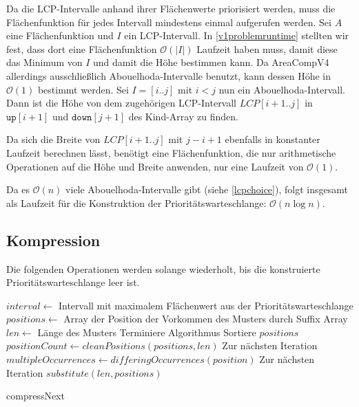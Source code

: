 Da die LCP-Intervalle anhand ihrer Flächenwerte priorisiert werden, muss die Flächenfunktion für jedes Intervall mindestens einmal aufgerufen werden. Sei $A$ eine Flächenfunktion und $I$ ein LCP-Intervall. In \autoref{v1problemruntime} stellten wir fest, dass dort eine Flächenfunktion $\mathcal{O}(|I|)$ Laufzeit haben muss, damit diese das Minimum von $I$ und damit die Höhe bestimmen kann.
Da AreaCompV4 allerdings ausschließlich Abouelhoda-Intervalle benutzt, kann dessen Höhe in $\mathcal{O}(1)$ bestimmt werden. Sei $I = [i..j]$ mit $i < j$ nun ein Abouelhoda-Intervall. Dann ist die Höhe von dem zugehörigen LCP-Intervall $LCP[i+1..j]$ in $\texttt{up}[i+1]$ und $\texttt{down}[j+1]$ des Kind-Array zu finden.

Da sich die Breite von $LCP[i+1..j]$ mit $j - i + 1$ ebenfalls in konstanter Laufzeit berechnen lässt, benötigt eine Flächenfunktion, die nur arithmetische Operationen auf die Höhe und Breite anwenden, nur eine Laufzeit von $\mathcal{O}(1)$.

Da es $\mathcal{O}(n)$ viele Abouelhoda-Intervalle gibt (siehe \autoref{lcpchoice}), folgt insgesamt als Laufzeit für die Konstruktion der Prioritätswarteschlange: $\mathcal{O}(n \log n)$.

\subsection{Kompression}

Die folgenden Operationen werden solange wiederholt, bis die konstruierte Prioritätswarteschlange leer ist. 

\begin{algorithm}
    $interval \leftarrow$ Intervall mit maximalem Flächenwert aus der Prioritätswarteschlange\;
    $positions \leftarrow$ Array der Position der Vorkommen des Musters durch Suffix Array\;
    $len \leftarrow$ Länge des Musters\;
     {
        Terminiere Algorithmus
    }
    Sortiere $positions$\;
    $positionCount \leftarrow cleanPositions(positions, len)$
     {
        Zur nächsten Iteration
    }
    $multipleOccurrences \leftarrow differingOccurrences(position)$
     {
        Zur nächsten Iteration
    }
    $substitute(len, positions)$\;

    \caption{compressNext}
    \label{compressNextv4}
\end{algorithm}

